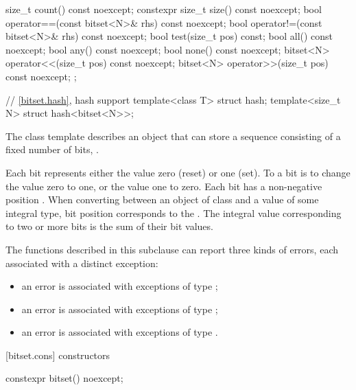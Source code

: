\begin{codeblock}
{{    size_t count() const noexcept;
    constexpr size_t size() const noexcept;
    bool operator==(const bitset<N>& rhs) const noexcept;
    bool operator!=(const bitset<N>& rhs) const noexcept;
    bool test(size_t pos) const;
    bool all() const noexcept;
    bool any() const noexcept;
    bool none() const noexcept;
    bitset<N> operator<<(size_t pos) const noexcept;
    bitset<N> operator>>(size_t pos) const noexcept;
  };

  // \ref{bitset.hash}, hash support
  template<class T> struct hash;
  template<size_t N> struct hash<bitset<N>>;
}
\end{codeblock}

\pnum
The class template
describes an object that can store a sequence consisting of a fixed number of
bits, .

\pnum
Each bit represents either the value zero (reset) or one (set).
To
a bit is to change the value zero to one, or the value one to
zero.
Each bit has a non-negative position .
When converting
between an object of class
and a value of some
integral type, bit position  corresponds to the
.
The integral value corresponding to two
or more bits is the sum of their bit values.

\pnum
The functions described in this subclause can report three kinds of
errors, each associated with a distinct exception:

\begin{itemize}
\item
an
error is associated with exceptions of type
;
%
\item
an
error is associated with exceptions of type
;
%
\item
an
error is associated with exceptions of type
.
%
\end{itemize}

[bitset.cons]{ constructors}

%
\begin{itemdecl}
constexpr bitset() noexcept;
\end{itemdecl}

